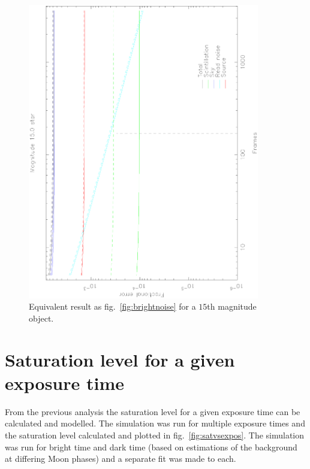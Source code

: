 \documentclass[11pt,a4paper]{report}
\begin{document}
\begin{figure}[h]
    \begin{center}
        \includegraphics[angle=270,width=0.9\textwidth]{images/faint}
    \end{center}
    \caption{Equivalent result as fig.~\ref{fig:brightnoise} for a
$15$th magnitude object.}
    \label{fig:faintnoise}
\end{figure}



\section{Saturation level for a given exposure time}
\label{sec:satlevel}

From the previous analysis the saturation level for a given exposure
time can be calculated and modelled. The simulation was run for multiple
exposure times and the saturation level calculated and plotted in
fig.~\ref{fig:satvsexpos}. The simulation was run for bright time and
dark time (based on estimations of the background at differing Moon
phases) and a separate fit was made to each.
\end{document}

